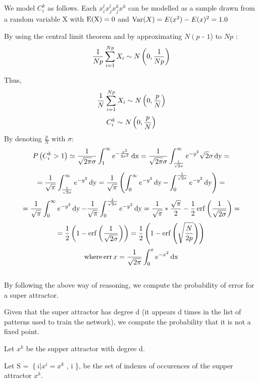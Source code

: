 We model $C_i^k $ as follows. Each $x^l_{i^{}} x^l_j x^k_{^{} j} x^k$ can be
modelled as a sample drawn from a random variable X with $\operatorname{E (X) = 0}$
and $\operatorname{Var} (X) = E (x^2) - E (x)^2 = 1.0$

By using the central limit theorem and by approximating $N \left( p \right.$ -
$1$) to $Np$ :
\[ \frac{1}{Np} \sum_{i = 1}^{Np} X_i \sim N \left( 0 , \frac{1}{N p}
   \right) \]


Thus,
\[ \frac{1}{N} \sum_{i = 1}^{Np} X_i \sim N \left( 0 , \frac{p}{N}
   \right) \]
\[ C^k_i \sim N \left( 0 , \frac{p}{N} \right) \]
By denoting $\frac{p}{N}$ with $\sigma :$
\[ P \left( C^k_i > 1 \right) \simeq \frac{1}{\sqrt{2 \pi} \sigma}
   \int^{\infty}_1 e^{- \frac{x^2}{2 \sigma^2}} \operatorname{dx} = \frac{1}{\sqrt{2
   \pi} \sigma} \int^{\infty}_{\frac{1}{\sqrt{2} \sigma}} e^{- y^2}
   \sqrt{2} \sigma \operatorname{dy} = \]
\[ = \frac{1}{\sqrt{\pi}} \int^{\infty}_{\frac{1}{\sqrt{2} \sigma}} e^{-
   y^2} \operatorname{dy} = \frac{1}{\sqrt{\pi}} \left( \int^{\infty}_0 e^{- y^2}
   \operatorname{dy} - \int^{\frac{1}{\sqrt{2} \sigma}}_0 e^{- y^2} \operatorname{dy} \right)
   = \]
\[ = \frac{1}{\sqrt{\pi}} \int^{\infty}_0 e^{- y^2} \operatorname{dy} -
   \frac{1}{\sqrt{\pi}} \int^{\frac{1}{\sqrt{2} \sigma}}_0 e^{- y^2}
   \operatorname{dy} = \frac{1}{\sqrt{\pi}} \ast \frac{\sqrt{\pi}}{2}  -
   \frac{1}{2} \operatorname{erf} \left( \frac{1}{\sqrt{2 \sigma}} \right) = \]
\[ = \frac{1}{2} \left( 1   - \operatorname{erf} \left( \frac{1}{\sqrt{2
   \sigma}} \right) \right) = \frac{1}{2} \left( 1   -
   {\operatorname{erf}} \left( \sqrt{\frac{N}{2 p}} \right) \right)  \]
\[ \operatorname{where} \operatorname{err} x = \frac{1}{\sqrt{2 \pi}} \int^x_0 e^{- x^2
   }_{^{^{}}} \operatorname{dx} \]

\[  \]
\[  \]



By following the above way of reasoning, we compute the probability of error
for a super attractor.

Given that the super attractor has degree d (it appears d times in the list of
patterns used to train the network), we compute the probability that it is not
a fixed point.

Let $x^k_{}$ be the supper attractor with degree d.

Let S = $\left\{ i \left|  \right. \right. x^i_{} = x^k$ , i {}\}, be the set of indexes of occurences of the
supper attractor $x^k_{}$.

